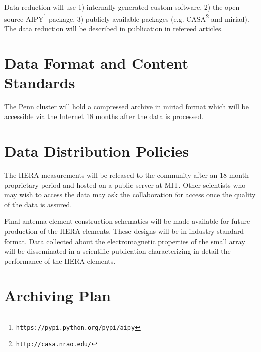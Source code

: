 \documentclass[preprint]{aastex}
\begin{document}
Data reduction will use 1) internally generated custom software, 2) the open-source AIPY\footnote{\tt https://pypi.python.org/pypi/aipy} package, 3) publicly available packages (e.g. CASA\footnote{ \tt http://casa.nrao.edu/} and {\sc miriad}).  The data reduction will be described in publication in refereed articles.  

% 

\section{Data Format and Content Standards}

The Penn cluster will hold a compressed archive in {\sc miriad} format which will be accessible via the Internet 18 months after the data is processed. 

% 
% 
%
\section{Data Distribution Policies}

The HERA measurements will be released to the community after an 18-month proprietary period and hosted on a public server at MIT.  Other scientists who may wish to access the data may ask the collaboration for access once the quality of the data is assured.  


Final antenna element construction schematics will be made available
for future production of the HERA elements. These designs will be in industry standard format.
Data collected about the electromagnetic properties of the small array will be
disseminated in a scientific publication characterizing in detail the
performance of the HERA elements.

\section{Archiving Plan}
\end{document}
